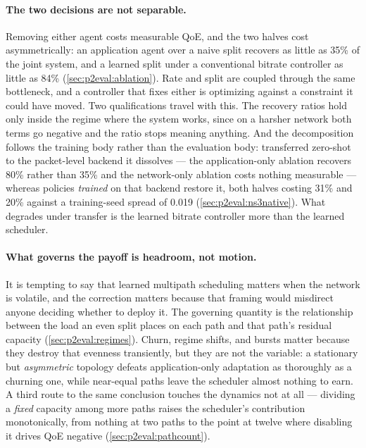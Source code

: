 \paragraph{The two decisions are not separable.} Removing either agent costs measurable QoE, and the
two halves cost asymmetrically: an application agent over a naive split recovers as little as 35\% of
the joint system, and a learned split under a conventional bitrate controller as little as 84\%
(\cref{sec:p2eval:ablation}). Rate and split are coupled through the same bottleneck, and a controller
that fixes either is optimizing against a constraint it could have moved. Two qualifications travel with
this. The recovery ratios hold only inside the regime where the system works, since on a harsher network
both terms go negative and the ratio stops meaning anything. And the decomposition follows the training
body rather than the evaluation body: transferred zero-shot to the packet-level backend it dissolves ---
the application-only ablation recovers 80\% rather than 35\% and the network-only ablation costs nothing
measurable --- whereas policies \emph{trained} on that backend restore it, both halves costing 31\% and
20\% against a training-seed spread of 0.019 (\cref{sec:p2eval:ns3native}). What degrades under transfer
is the learned bitrate controller more than the learned scheduler.

\paragraph{What governs the payoff is headroom, not motion.} It is tempting to say that learned
multipath scheduling matters when the network is volatile, and the correction matters because that
framing would misdirect anyone deciding whether to deploy it. The governing quantity is the relationship
between the load an even split places on each path and that path's residual capacity
(\cref{sec:p2eval:regimes}). Churn, regime shifts, and bursts matter because they destroy that evenness
transiently, but they are not the variable: a stationary but \emph{asymmetric} topology defeats
application-only adaptation as thoroughly as a churning one, while near-equal paths leave the scheduler
almost nothing to earn. A third route to the same conclusion touches the dynamics not at all --- dividing
a \emph{fixed} capacity among more paths raises the scheduler's contribution monotonically, from nothing
at two paths to the point at twelve where disabling it drives QoE negative
(\cref{sec:p2eval:pathcount}).

